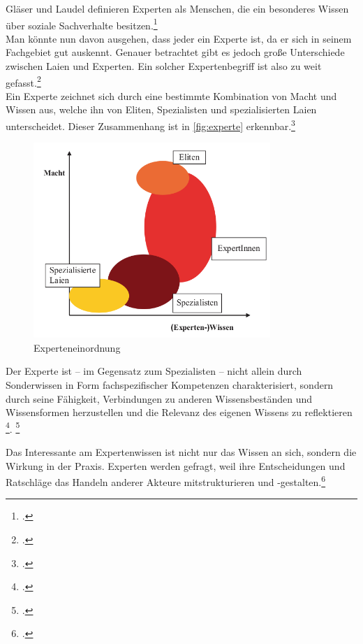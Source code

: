 Gläser und Laudel definieren Experten als Menschen, die ein besonderes Wissen über soziale Sachverhalte besitzen.\footcite[Vgl.][12]{Glaeser_2010_Inhaltsanalyse}\\
Man könnte nun davon ausgehen, dass jeder ein Experte ist, da er sich in seinem Fachgebiet gut auskennt. Genauer betrachtet  gibt es jedoch große Unterschiede zwischen Laien und Experten. Ein solcher Expertenbegriff ist also zu weit gefasst.\footcite[Vgl.][10\psq]{Bogner_2014_Interview}\\
Ein Experte zeichnet sich durch eine bestimmte Kombination von Macht und Wissen aus, welche ihn von Eliten, Spezialisten und spezialisierten Laien unterscheidet. Dieser Zusammenhang ist in  \autoref{fig:experte} erkennbar.\footcite[Vgl.][o. \pno]{Littig_2008}

\begin{figure}[H]
  \centering
  \includegraphics[width=0.8\textwidth]{Anhang/Experte}
  \caption{Experteneinordnung}
\label{fig:experte}
\end{figure}

\glqq{}Der Experte ist -- im Gegensatz zum Spezialisten – nicht allein durch Sonderwissen in Form fachspezifischer Kompetenzen charakterisiert, sondern durch seine Fähigkeit, Verbindungen zu anderen Wissensbeständen und Wissensformen herzustellen und die Relevanz des eigenen Wissens zu reflektieren\grqq
\footcite[][14]{Bogner_2014_Interview}{}.
\footcite[Vgl.][21 \psq]{Hitzler_1994}

Das Interessante am Expertenwissen ist nicht nur das Wissen an sich, sondern die Wirkung in der Praxis. Experten werden gefragt, weil ihre Entscheidungen und Ratschläge das Handeln anderer Akteure mitstrukturieren und -gestalten.\footcite[Vgl.][13]{Bogner_2014_Interview}

